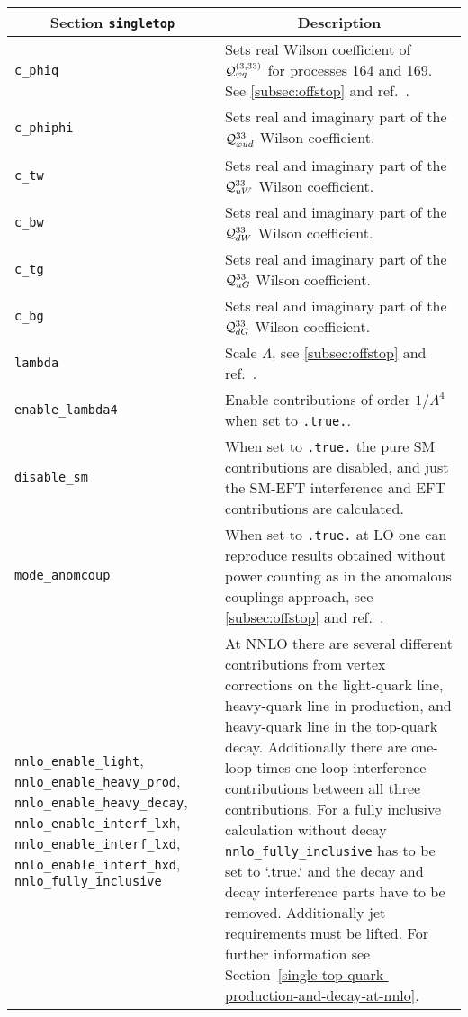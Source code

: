 	\begin{longtable}{p{4.5cm}p{10.5cm}}
		\hline
		\multicolumn{1}{c}{{\textbf{Section} \texttt{singletop}}} & \multicolumn{1}{c}{{\textbf{Description}}} \\ 
		\hline
		\texttt{c\_phiq} & Sets real Wilson coefficient of $\mathcal{Q}_{\varphi q}^{(3,33)}$ for processes 164 and 169. See \ref{subsec:offstop} 
		and ref.~\cite{Neumann:2019kvk}. \\
		\texttt{c\_phiphi} & Sets real and imaginary part of the $\mathcal{Q}_{\varphi u d }^{33}$ Wilson coefficient. \\
		\texttt{c\_tw} & Sets real and imaginary part of the $\mathcal{Q}_{uW}^{33}$ Wilson coefficient. \\
		\texttt{c\_bw} & Sets real and imaginary part of the $\mathcal{Q}_{dW}^{33}$ Wilson coefficient. \\
		\texttt{c\_tg} & Sets real and imaginary part of the $\mathcal{Q}_{uG}^{33} $ Wilson coefficient. \\
		\texttt{c\_bg} & Sets real and imaginary part of the $\mathcal{Q}_{dG}^{33}$ Wilson coefficient. \\
		\texttt{lambda} & Scale $\Lambda$, see \ref{subsec:offstop} and ref.~\cite{Neumann:2019kvk}. \\
		\texttt{enable\_lambda4} & Enable contributions of order $1/\Lambda^4$ when set to \texttt{.true.}. \\
		\texttt{disable\_sm} & When set to \texttt{.true.} the pure SM contributions are disabled, and just
		the SM-EFT interference and EFT contributions are calculated. \\
		\texttt{mode\_anomcoup} & When set to \texttt{.true.} at LO one can reproduce results obtained
			without power counting as in the anomalous couplings approach, see \ref{subsec:offstop} and 
			ref.~\cite{Neumann:2019kvk}. \\
               \texttt{nnlo\_enable\_light},
               \texttt{nnlo\_enable\_heavy\_prod},
               \texttt{nnlo\_enable\_heavy\_decay},
               \texttt{nnlo\_enable\_interf\_lxh},
               \texttt{nnlo\_enable\_interf\_lxd},
               \texttt{nnlo\_enable\_interf\_hxd},
               \texttt{nnlo\_fully\_inclusive}&
               At NNLO there are several different contributions from vertex
               corrections on the light-quark line, heavy-quark line in production, and
               heavy-quark line in the top-quark decay. Additionally there are one-loop
               times one-loop interference contributions between all three
               contributions. For a fully inclusive calculation without decay
	       \texttt{nnlo\_fully\_inclusive}  has to
               be set to `.true.` and the decay and decay interference parts have to be
               removed.	 Additionally jet requirements must be lifted.  For further information see
	       Section~\ref{single-top-quark-production-and-decay-at-nnlo}.      \\
    \hline
	\end{longtable}

 

